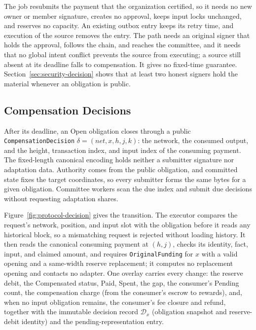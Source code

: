 The job resubmits the payment that the organization certified, so it needs no new owner or member signature, creates no approval, keeps input locks unchanged, and reserves no capacity. An existing outbox entry keeps its retry time, and execution of the source removes the entry. The path needs an original signer that holds the approval, follows the chain, and reaches the committee, and it needs that no global intent conflict prevents the source from executing; a source still absent at its deadline falls to compensation. It gives no fixed-time guarantee. Section~\ref{sec:security-decision} shows that at least two honest signers hold the material whenever an obligation is public.

\subsection{Compensation Decisions}
\label{sec:protocol-decision}

After its deadline, an Open obligation closes through a public \texttt{CompensationDecision} $\delta=(\mathit{net},x,h,j,k)$: the network, the consumed output, and the height, transaction index, and input index of the consuming payment. The fixed-length canonical encoding holds neither a submitter signature nor adaptation data. Authority comes from the public obligation, and committed state fixes the target coordinates, so every submitter forms the same bytes for a given obligation. Committee workers scan the due index and submit due decisions without requesting adaptation shares.

Figure~\ref{fig:protocol-decision} gives the transition. The executor compares the request's network, position, and input slot with the obligation before it reads any historical block, so a mismatching request is rejected without loading history. It then reads the canonical consuming payment at $(h,j)$, checks its identity, fact, input, and claimed amount, and requires \texttt{OriginalFunding} for $x$ with a valid opening and a same-width reserve replacement; it computes no replacement opening and contacts no adapter. One overlay carries every change: the reserve debit, the Compensated status, Paid, Spent, the gap, the consumer's Pending count, the compensation charge (from the consumer's escrow to rewards), and, when no input obligation remains, the consumer's fee closure and refund, together with the immutable decision record $\mathcal D_x$ (obligation snapshot and reserve-debit identity) and the pending-representation entry.


